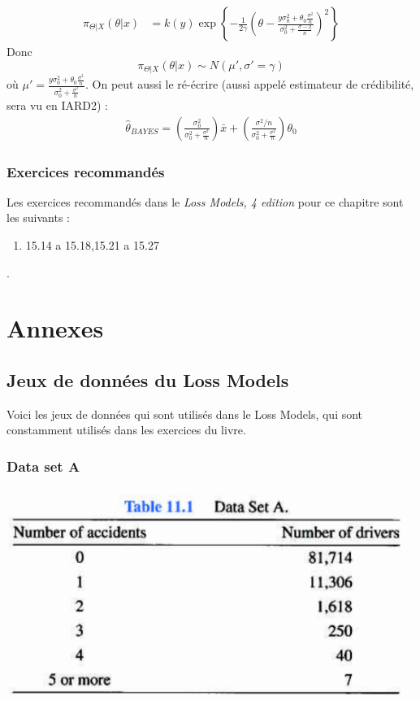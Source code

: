 \documentclass[12pt, french]{report}
\begin{document}
\begin{exemple}
\begin{align*}
\pi_{\Theta | X}(\theta | x) & = k(y) \exp \left \{ - \frac{1}{2 \gamma} \left( \theta - \frac{y \sigma_0^2 + \theta_0 \frac{\sigma^2}{n}}{\sigma_0^2 + \frac{\sigma-2}{n}} \right)^2   \right \}
\end{align*}
Donc
\[\pi_{\Theta | X}(\theta | x)  \sim N(\mu', \sigma' = \gamma) \]
où $\mu' = \frac{y \sigma_0^2 + \theta_0 \frac{\sigma^2}{n}}{\sigma_0^2 + \frac{\sigma^2}{n}}$. On peut aussi le ré-écrire (aussi appelé estimateur de crédibilité, sera vu en IARD2) : 
\begin{align*}
\hat{\theta}_{BAYES} = \left( \frac{\sigma_0^2}{\sigma_0^2 + \frac{\sigma^2}{n}} \right) \bar{x} + \left( \frac{\sigma^2 / n}{\sigma_0^2 + \frac{\sigma^2}{n}} \right) \theta_0
\end{align*}
\end{exemple}



\section{Exercices recommandés}
Les exercices recommandés dans le \emph{Loss Models, 4 edition} pour ce chapitre sont les suivants : 
\begin{enumerate}[label=\faAngleRight]
\item  15.14 a 15.18,15.21 a 15.27
\end{enumerate}
.



\part{Annexes}

\appendix
\chapter{Jeux de données du Loss Models}
Voici les jeux de données qui sont utilisés dans le Loss Models, qui sont constamment utilisés dans les exercices du livre.

\section{Data set A}
\begin{center}
\includegraphics[scale=0.5]{src/Data-Set-A.png}
\end{center}
\end{document}
